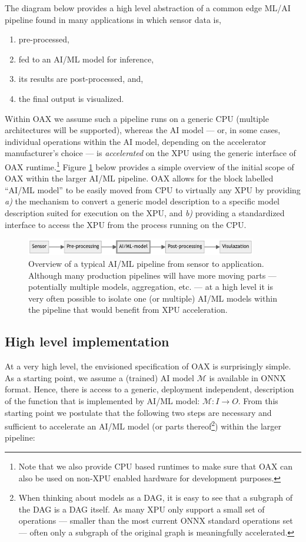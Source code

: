 \documentclass{article}
\begin{document}
The diagram below provides a high level abstraction of a common edge ML/AI pipeline found in many applications in which sensor data is, 
\begin{enumerate}
\item pre-processed, 
\item fed to an AI/ML model for inference, 
\item its results are post-processed, and, 
\item the final output is visualized. 
\end{enumerate}

Within OAX we assume such a pipeline runs on a generic CPU (multiple architectures will be supported), whereas the AI model --- or, in some cases, individual operations within the AI model, depending on the accelerator manufacturer's choice --- is \emph{accelerated} on the XPU using the generic interface of OAX runtime.\footnote{Note that we also provide CPU based runtimes to make sure that OAX can also be used on non-XPU enabled hardware for development purposes.} Figure \ref{fig-pipeline} below provides a simple overview of the initial scope of OAX within the larger AI/ML pipeline. OAX allows for the block labelled ``AI/ML model'' to be easily moved from CPU to virtually any XPU by providing \emph{a)} the mechanism to convert a generic model description to a specific model description suited for execution on the XPU, and \emph{b)} providing a standardized interface to access the XPU from the process running on the CPU.

\begin{figure} [!htbp]
\centering
\includegraphics[width=0.9\textwidth]{img/pipeline}
\caption{Overview of a typical AI/ML pipeline from sensor to application. Although many production pipelines will have more moving parts --- potentially multiple models, aggregation, etc. --- at a high level it is very often possible to isolate one (or multiple) AI/ML models within the pipeline that would benefit from XPU acceleration.}
\label{fig-pipeline}
\end{figure}

\subsection{High level implementation}

At a very high level, the envisioned specification of OAX is surprisingly simple. As a starting point, we assume a (trained) AI model $\mathcal{M}$ is available in ONNX format. Hence, there is access to a generic, deployment independent, description of the function that is implemented by AI/ML model: $\mathcal{M} \colon I \to O$.  From this starting point we postulate that  the following two steps are necessary and sufficient to accelerate an AI/ML model (or parts thereof\footnote{When thinking about models as a DAG, it is easy to see that a subgraph of the DAG is a DAG itself. As many XPU only support a small set of operations --- smaller than the most current ONNX standard operations set --- often only a subgraph of the original graph is meaningfully accelerated.}) within the larger pipeline:
\end{document}
